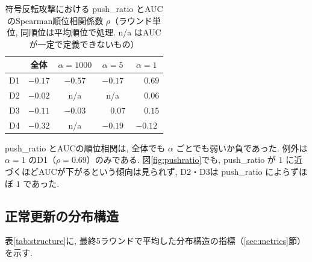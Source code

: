 \documentclass[a4j, twocolumn, dvipdfmx]{jsarticle}
\newcommand{\PushRatio}{\textrm{push\_ratio}}
\begin{document}
\begin{table}[t]
\centering
\caption{符号反転攻撃における \PushRatio{} とAUCのSpearman順位相関係数 $\rho$（ラウンド単位, 同順位は平均順位で処理. n/a はAUCが一定で定義できないもの）}
\label{tab:corr}
\begin{tabular}{@{}lcccc@{}}
\toprule
 & 全体 & $\alpha=1000$ & $\alpha=5$ & $\alpha=1$ \\
\midrule
D1 & $-0.17$ & $-0.57$ & $-0.17$ & $\phantom{-}0.69$ \\
D2 & $-0.02$ & n/a & n/a & $\phantom{-}0.06$ \\
D3 & $-0.11$ & $-0.03$ & $\phantom{-}0.07$ & $\phantom{-}0.15$ \\
D4 & $-0.32$ & n/a & $-0.19$ & $-0.12$ \\
\bottomrule
\end{tabular}
\end{table}

\PushRatio{} とAUCの順位相関は, 全体でも $\alpha$ ごとでも弱いか負であった. 例外は $\alpha=1$ のD1（$\rho=0.69$）のみである. 図\ref{fig:pushratio}でも, \PushRatio{} が $1$ に近づくほどAUCが下がるという傾向は見られず, D2・D3は \PushRatio{} によらずほぼ $1$ であった.

\subsection{正常更新の分布構造}
\label{sec:res-structure}

表\ref{tab:structure}に, 最終5ラウンドで平均した分布構造の指標（\ref{sec:metrics}節）を示す.
\end{document}
